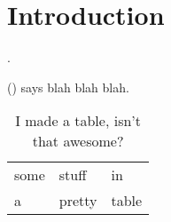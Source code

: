 %
%
\part{Introduction}
\label{chap:intro}


\blindtext \parencite{Duong2011}.

\citeauthor{Sitaram2011} (\citeyear{Sitaram2011}) says blah blah blah.

\begin{table}
\caption{I made a table, isn't that awesome?}
\begin{tabular}{lll}
some & stuff & in \\
a & pretty & table \\
\end{tabular}
\end{table}



\Blindtext[1][2]


